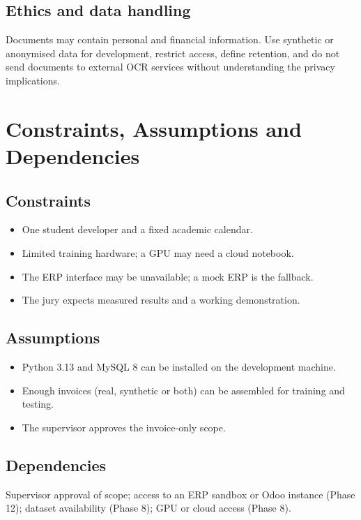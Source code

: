 \section{Ethics and data handling}
Documents may contain personal and financial information. Use synthetic or anonymised data for development, restrict access, define retention, and do not send documents to external OCR services without understanding the privacy implications.

\chapter{Constraints, Assumptions and Dependencies}
\section{Constraints}
\begin{itemize}
\item One student developer and a fixed academic calendar.
\item Limited training hardware; a GPU may need a cloud notebook.
\item The ERP interface may be unavailable; a mock ERP is the fallback.
\item The jury expects measured results and a working demonstration.
\end{itemize}
\section{Assumptions}
\begin{itemize}
\item Python 3.13 and MySQL 8 can be installed on the development machine.
\item Enough invoices (real, synthetic or both) can be assembled for training and testing.
\item The supervisor approves the invoice-only scope.
\end{itemize}
\section{Dependencies}
Supervisor approval of scope; access to an ERP sandbox or Odoo instance (Phase 12); dataset availability (Phase 8); GPU or cloud access (Phase 8).

